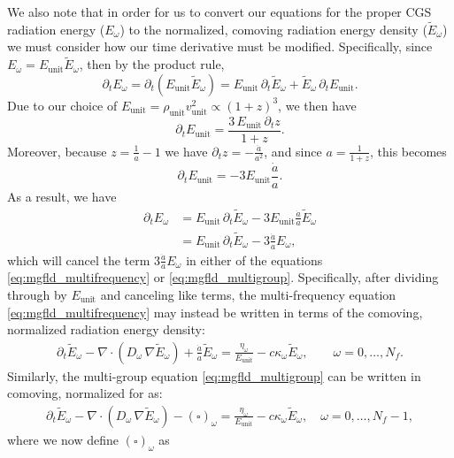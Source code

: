 \documentclass[10pt]{article}
\renewcommand{\(}{\left(}
\renewcommand{\)}{\right)}
\newcommand{\adot}{\dot{a}}
\newcommand{\Dunit}{\rho_{\text{unit}}}
\newcommand{\Vunit}{v_{\text{unit}}}
\newcommand{\Eunit}{E_{\text{unit}}}
\newcommand{\tE}{\tilde{E}}
\begin{document}
We also note that in order for us to convert our equations
for the proper CGS radiation energy ($E_{\omega}$) to the normalized,
comoving radiation energy density ($\tE_{\omega}$) we must consider how our
time derivative must be modified.  Specifically, since $E_{\omega} = \Eunit
\tE_{\omega}$, then by the product rule,
\[
   \partial_t E_{\omega} = \partial_t \left(\Eunit \tE_{\omega}\right) = 
   \Eunit\, \partial_t \tE_{\omega} + \tE_{\omega}\, \partial_t \Eunit.
\]
Due to our choice of $\Eunit = \Dunit \Vunit^2 \propto (1+z)^3$, we then have 
\[
   \partial_t \Eunit = \frac{3\, \Eunit\, \partial_t z}{1+z}.
\]
Moreover, because $z = \frac{1}{a}-1$ we have $\partial_t z =
-\frac{\adot}{a^2}$, and since $a = \frac{1}{1+z}$, this becomes 
\[
   \partial_t \Eunit = -3\Eunit\frac{\adot}{a}.
\]
As a result, we have 
\begin{align*}
   \partial_t E_{\omega} &= \Eunit\, \partial_t \tE_{\omega} - 3\Eunit \frac{\adot}{a} \tE_{\omega} \\
   &= \Eunit\, \partial_t \tE_{\omega} - 3\frac{\adot}{a} E_{\omega},
\end{align*}
which will cancel the term $3 \frac{\adot}{a} E_{\omega}$ in either of the
equations \eqref{eq:mgfld_multifrequency} or
\eqref{eq:mgfld_multigroup}.  Specifically, after dividing through by 
$\Eunit$ and canceling like terms, the multi-frequency equation
\eqref{eq:mgfld_multifrequency} may instead be written in terms of the
comoving, normalized radiation energy density: 
\begin{align}
  \label{eq:mgfld_multifrequency_Ecomoving}
  \partial_{t} \tE_{\omega} - \nabla\cdot(D_{\omega}\,\nabla
  \tE_{\omega}) + \frac{\adot}{a}\tE_{\omega}
    = \frac{\eta_{\omega}}{\Eunit} - c \kappa_{\omega} \tE_{\omega}, \qquad \omega=0,\ldots,N_f.
\end{align}
Similarly, the multi-group equation \eqref{eq:mgfld_multigroup} can be
written in comoving, normalized for as:
\begin{align}
  \label{eq:mgfld_multigroup_Ecomoving}
  \partial_{t} \tE_{\omega} - \nabla\cdot(D_{\omega}\,\nabla \tE_{\omega}) -
    (\square)_{\omega} = \frac{\eta_{\omega}}{\Eunit} - c\kappa_{\omega} \tE_{\omega},
    \quad \omega=0,\ldots,N_f-1,
\end{align}
where we now define $(\square)_{\omega}$ as 
\end{document}
